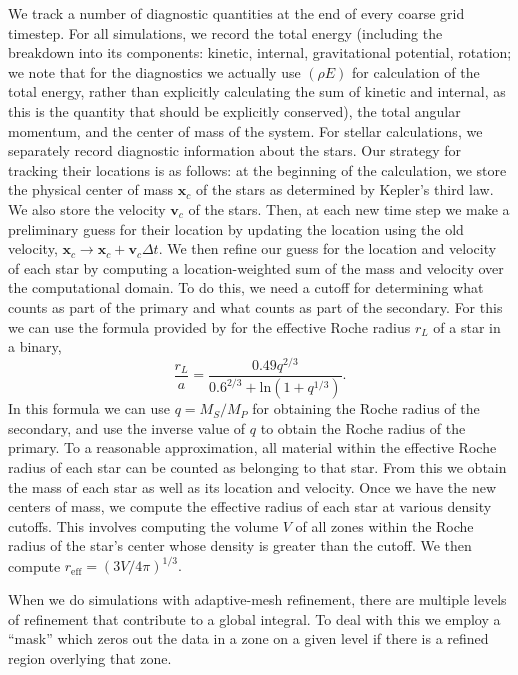 \documentclass[iop]{../emulateapj}
\begin{document}
We track a number of diagnostic quantities at the end of every coarse grid timestep. 
For all simulations, we record the total energy (including the breakdown into
its components: kinetic, internal, gravitational potential, rotation; we note
that for the diagnostics we actually use $(\rho E)$ for calculation of the total energy,
rather than explicitly calculating the sum of kinetic and internal, as this is
the quantity that should be explicitly conserved), 
the total angular momentum, and the center of mass of the system. 
For stellar calculations, we separately record diagnostic 
information about the stars. Our strategy for tracking their 
locations is as follows: at the beginning of the calculation, we store the 
physical center of mass $\mathbf{x}_{c}$ of the stars as determined 
by Kepler's third law. We also store the velocity $\mathbf{v}_{c}$ 
of the stars. Then, at each new time step we make a preliminary guess for their 
location by updating the location using the old velocity, 
$\mathbf{x}_{c} \rightarrow \mathbf{x}_{c} + \mathbf{v}_{c} \Delta t$.
We then refine our guess for the location and velocity of each star by computing a
location-weighted sum of the mass and velocity over the computational domain. 
To do this, we need a cutoff for determining what counts as part of the primary 
and what counts as part of the secondary. For this we can use the formula provided by 
\citet{eggleton:1983} for the effective Roche radius $r_L$ of a star in a binary,
\begin{equation}
  \frac{r_L}{a} = \frac{0.49 q^{2/3}}{0.6^{2/3} + \text{ln}(1 + q^{1/3})}.
\end{equation}
In this formula we can use $q = M_S / M_P$ for obtaining the Roche radius of the secondary,
and use the inverse value of $q$ to obtain the Roche radius of the primary.
To a reasonable approximation, all material within the effective Roche radius
of each star can be counted as belonging to that star. From this we obtain the mass
of each star as well as its location and velocity. Once we have the new centers of mass,
we compute the effective radius of each star at various density cutoffs. This involves 
computing the volume $V$ of all zones within the Roche radius of the star's center 
whose density is greater than the cutoff. We then compute $r_{\text{eff}} = (3V/4\pi)^{1/3}.$

When we do simulations with adaptive-mesh refinement, there are multiple levels of refinement 
that contribute to a global integral. To deal with this we employ a ``mask'' which zeros out 
the data in a zone on a given level if there is a refined region overlying that zone.
\end{document}
